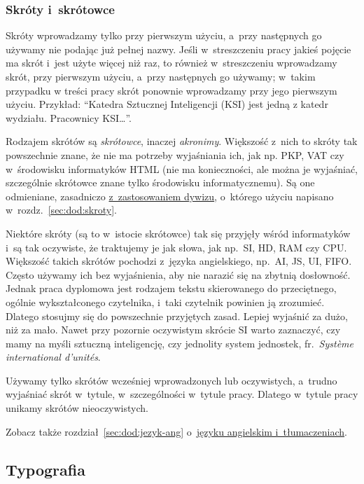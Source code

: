 \subsubsection{Skróty i~skrótowce}
\label{sec:dod:skroty}

Skróty wprowadzamy tylko przy pierwszym użyciu, a~przy następnych go używamy nie podając już pełnej nazwy. Jeśli w~streszczeniu pracy jakieś pojęcie ma skrót i~jest użyte więcej niż raz, to również w~streszczeniu wprowadzamy skrót, przy pierwszym użyciu, a~przy następnych go używamy; w~takim przypadku w treści pracy skrót ponownie wprowadzamy przy jego pierwszym użyciu. Przykład: ``Katedra Sztucznej Inteligencji (KSI) jest jedną z katedr wydziału. Pracownicy KSI\dots''.

Rodzajem skrótów są {\em skrótowce}, inaczej {\em akronimy}. Większość z~nich to skróty tak powszechnie znane, że nie ma potrzeby wyjaśniania ich, jak np. PKP, VAT czy w~środowisku informatyków HTML (nie ma konieczności, ale można je wyjaśniać, szczególnie skrótowce znane tylko środowisku informatycznemu). Są one odmieniane, zasadniczo \hyperref[sec:dod:apostrof-dywiz]{z~zastosowaniem dywizu}, o~którego użyciu napisano w~rozdz.~\ref{sec:dod:skroty}.

Niektóre skróty (są to w~istocie skrótowce) tak się przyjęły wśród informatyków i~są tak oczywiste, że traktujemy je jak słowa, jak np.\ SI, HD, RAM czy CPU. Większość takich skrótów pochodzi z~języka angielskiego, np.\ AI, JS, UI, FIFO. Często używamy ich bez wyjaśnienia, aby nie narazić się na zbytnią dosłowność. Jednak praca dyplomowa jest rodzajem tekstu skierowanego do przeciętnego, ogólnie wykształconego czytelnika, i~taki czytelnik powinien ją zrozumieć. Dlatego stosujmy się do powszechnie przyjętych zasad. Lepiej wyjaśnić za dużo, niż za mało. Nawet przy pozornie oczywistym skrócie SI warto zaznaczyć, czy mamy na myśli sztuczną inteligencję, czy jednolity system jednostek, fr.\ {\em Système international d'unités}.

Używamy tylko skrótów wcześniej wprowadzonych lub oczywistych, a~trudno wyjaśniać skrót w~tytule, w~szczególności w~tytule pracy. Dlatego w~tytule pracy unikamy skrótów nieoczywistych.

Zobacz także rozdział~\ref{sec:dod:jezyk-ang} o~\hyperref[sec:dod:jezyk-ang]{języku angielskim i~tłumaczeniach}.


\subsection{Typografia}
\label{sec:dod:typografia}

